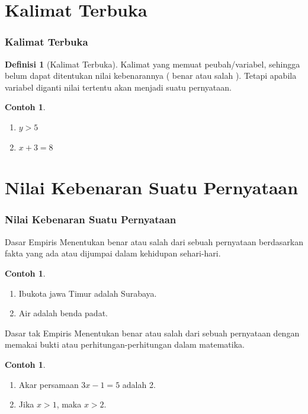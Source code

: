 \documentclass[handout]{beamer}
\theoremstyle{definition}
\newtheorem{definisi}[theorem]{Definisi}
\theoremstyle{example}
\newtheorem{contoh}[theorem]{Contoh}
\begin{document}
\section{Kalimat Terbuka}
\begin{frame}
	\frametitle{Kalimat Terbuka}

\begin{definisi}[Kalimat Terbuka]
	 Kalimat yang memuat peubah/variabel, sehingga belum dapat ditentukan nilai kebenarannya ( benar atau salah ). Tetapi apabila variabel diganti nilai tertentu akan menjadi suatu pernyataan.
\end{definisi}

\begin{contoh}
	\begin{enumerate}
		\item $y>5$	
		\item $x + 3 = 8$	
	\end{enumerate}
\end{contoh}

\end{frame}

\section{Nilai Kebenaran Suatu Pernyataan}
\begin{frame}[shrink]
\frametitle{Nilai Kebenaran Suatu Pernyataan}
  \begin{block}{Dasar Empiris}
  	Menentukan benar atau salah dari sebuah pernyataan berdasarkan fakta yang ada atau dijumpai dalam kehidupan sehari-hari.
  \end{block}
  
  \begin{contoh}
  	\begin{enumerate}
  		\item Ibukota jawa Timur adalah Surabaya.
  		\item Air adalah benda padat.
  	\end{enumerate}
  \end{contoh}
  
  
  \begin{block}{Dasar tak Empiris}
  	Menentukan benar atau salah dari sebuah pernyataan dengan memakai bukti atau perhitungan-perhitungan dalam matematika.
  \end{block}

  \begin{contoh}
  	\begin{enumerate}
  		\item Akar persamaan $3x-1=5$ adalah 2.
  		\item Jika $x > 1$, maka $x > 2$.
  			
  	\end{enumerate}
  \end{contoh}
\end{frame}
\end{document}
